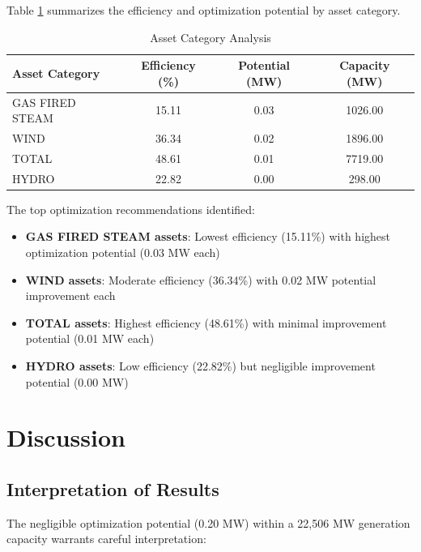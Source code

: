 \documentclass[12pt,a4paper]{article}
\begin{document}
Table \ref{tab:asset-analysis} summarizes the efficiency and optimization potential by asset category.

\begin{table}[htbp]
\centering
\caption{Asset Category Analysis}
\label{tab:asset-analysis}
\begin{tabular}{lccc}
\toprule
\textbf{Asset Category} & \textbf{Efficiency (\%)} & \textbf{Potential (MW)} & \textbf{Capacity (MW)} \\
\midrule
GAS FIRED STEAM & 15.11 & 0.03 & 1026.00 \\
WIND & 36.34 & 0.02 & 1896.00 \\
TOTAL & 48.61 & 0.01 & 7719.00 \\
HYDRO & 22.82 & 0.00 & 298.00 \\
\bottomrule
\end{tabular}
\end{table}

The top optimization recommendations identified:
\begin{itemize}
    \item \textbf{GAS FIRED STEAM assets}: Lowest efficiency (15.11\%) with highest optimization potential (0.03 MW each)
    \item \textbf{WIND assets}: Moderate efficiency (36.34\%) with 0.02 MW potential improvement each
    \item \textbf{TOTAL assets}: Highest efficiency (48.61\%) with minimal improvement potential (0.01 MW each)
    \item \textbf{HYDRO assets}: Low efficiency (22.82\%) but negligible improvement potential (0.00 MW)
\end{itemize}

\section{Discussion}

\subsection{Interpretation of Results}

The negligible optimization potential (0.20 MW) within a 22,506 MW generation capacity warrants careful interpretation:
\end{document}

